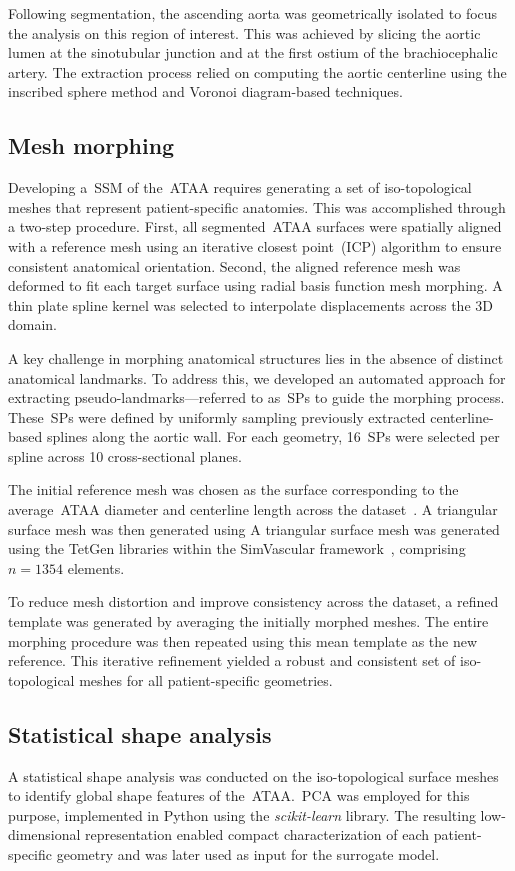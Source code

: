 \documentclass[a4paper,fleqn]{cas-sc}
\begin{document}
  Following segmentation, the ascending aorta was geometrically isolated to focus the analysis on this region of interest. This was achieved by slicing the aortic lumen at the sinotubular junction and at the first ostium of the brachiocephalic artery. The extraction process relied on computing the aortic centerline using the inscribed sphere method and Voronoi diagram-based techniques.

\subsection{Mesh morphing}
  Developing a~\gls{SSM} of the~\gls{ATAA} requires generating a set of iso-topological meshes that represent patient-specific anatomies. This was accomplished through a two-step procedure. First, all segmented~\gls{ATAA} surfaces were spatially aligned with a reference mesh using an iterative closest point~(\gls{ICP}) algorithm to ensure consistent anatomical orientation. Second, the aligned reference mesh was deformed to fit each target surface using radial basis function mesh morphing. A thin plate spline kernel was selected to interpolate displacements across the 3D domain.

  A key challenge in morphing anatomical structures lies in the absence of distinct anatomical landmarks. To address this, we developed an automated approach for extracting pseudo-landmarks—referred to as~\glspl{SP} to guide the morphing process. These~\glspl{SP} were defined by uniformly sampling previously extracted centerline-based splines along the aortic wall. For each geometry, 16~\glspl{SP} were selected per spline across 10 cross-sectional planes.

  The initial reference mesh was chosen as the surface corresponding to the average~\gls{ATAA} diameter and centerline length across the dataset~\cite{Geronzi2023_dy,GRASSI2011112}. A triangular surface mesh was then generated using A triangular surface mesh was generated using the TetGen libraries within the SimVascular framework~\cite{updegrove2017}, comprising $n = 1354$ elements.

  To reduce mesh distortion and improve consistency across the dataset, a refined template was generated by averaging the initially morphed meshes. The entire morphing procedure was then repeated using this mean template as the new reference. This iterative refinement yielded a robust and consistent set of iso-topological meshes for all patient-specific geometries.

\subsection{Statistical shape analysis}
  A statistical shape analysis was conducted on the iso-topological surface meshes to identify global shape features of the~\gls{ATAA}.~\gls{PCA} was employed for this purpose, implemented in Python using the \textit{scikit-learn} library. The resulting low-dimensional representation enabled compact characterization of each patient-specific geometry and was later used as input for the surrogate model.
\end{document}
